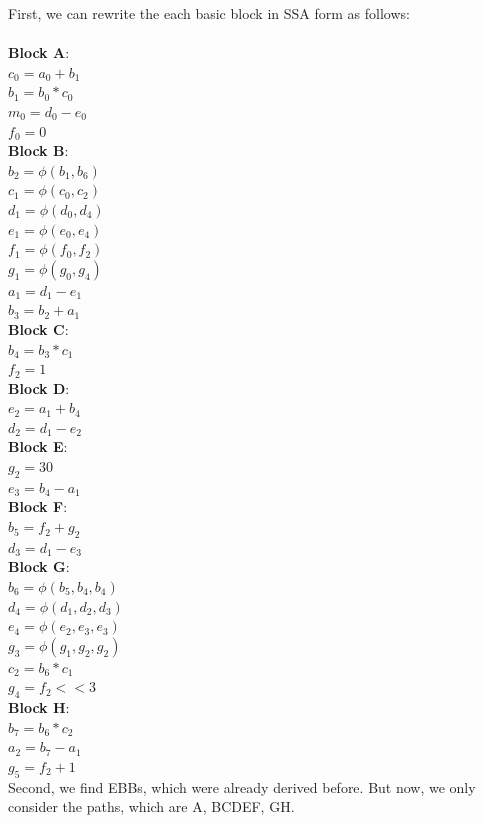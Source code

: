 \documentclass[11pt]{article}
\begin{document}
\begin{enumerate}
\begin{Answer}
		First, we can rewrite the each basic block in SSA form as follows: \\ \\
		\textbf{Block A}: \\
		$c_0 = a_0 + b_1$ \\
		$b_1 = b_0 * c_0$ \\
		$m_0 = d_0 - e_0$ \\
		$f_0 = 0$ \\
		\textbf{Block B}: \\
		$b_2 = \phi(b_1, b_6)$ \\
		$c_1 = \phi(c_0, c_2)$ \\
		$d_1 = \phi(d_0, d_4)$ \\
		$e_1 = \phi(e_0, e_4)$ \\
		$f_1 = \phi(f_0, f_2)$ \\
		$g_1 = \phi(g_0, g_4)$ \\
		$a_1 = d_1 - e_1$ \\
		$b_3 = b_2 + a_1$ \\
		\textbf{Block C}: \\
		$b_4 = b_3 * c_1$ \\
		$f_2 = 1$ \\
		\textbf{Block D}: \\
		$e_2 = a_1 + b_4$ \\
		$d_2 = d_1 - e_2$ \\
		\textbf{Block E}: \\
		$g_2 = 30$ \\
		$e_3 = b_4 - a_1$ \\
		\textbf{Block F}: \\
		$b_5 = f_2 + g_2$ \\
		$d_3 = d_1 - e_3$ \\
		\textbf{Block G}: \\
		$b_6 = \phi(b_5, b_4, b_4)$ \\
		$d_4 = \phi(d_1, d_2, d_3)$ \\
		$e_4 = \phi(e_2, e_3, e_3)$ \\
		$g_3 = \phi(g_1, g_2, g_2)$ \\
		$c_2 = b_6 * c_1$ \\
		$g_4 = f_2 << 3$ \\
		\textbf{Block H}: \\
		$b_7 = b_6 * c_2$ \\
		$a_2 = b_7 - a_1$ \\
		$g_5 = f_2 + 1$ \\
		
		
		Second, we find EBBs, which were already derived before. But now, we only consider the paths, which are A, BCDEF, GH.
		

\end{Answer}
\end{enumerate}
\end{document}
